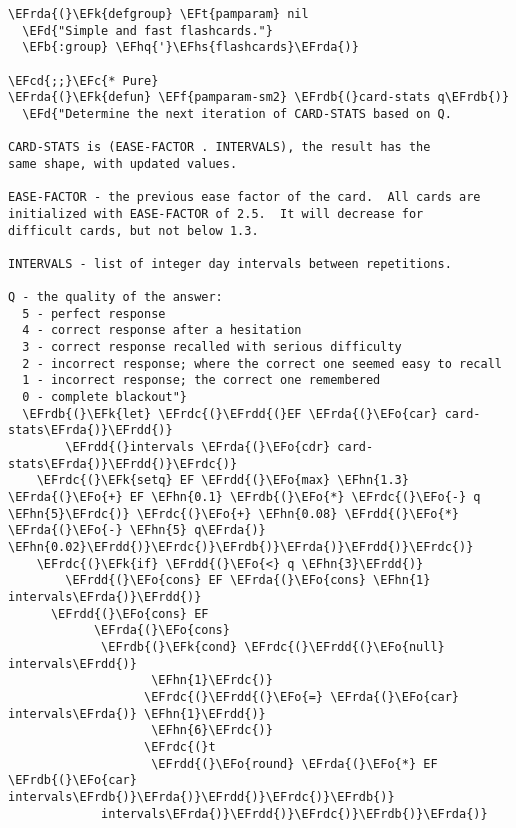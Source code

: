 \documentclass[a4wide,10pt]{article}
\newcommand{\EFc}[1]{\textcolor{EFc}{#1}} %
\newcommand{\EFcd}[1]{\textcolor{EFcd}{#1}} %
\newcommand{\EFd}[1]{\textcolor{EFd}{#1}} %
\newcommand{\EFk}[1]{\textcolor{EFk}{#1}} %
\newcommand{\EFb}[1]{\textcolor{EFb}{#1}} %
\newcommand{\EFf}[1]{\textcolor{EFf}{#1}} %
\newcommand{\EFt}[1]{\textcolor{EFt}{#1}} %
\newcommand{\EFo}[1]{\textcolor{EFo}{#1}} %
\newcommand{\EFhn}[1]{\textcolor{EFhn}{\textbf{#1}}} %
\newcommand{\EFhq}[1]{\textcolor{EFhq}{#1}} %
\newcommand{\EFhs}[1]{\textcolor{EFhs}{#1}} %
\newcommand{\EFrda}[1]{\textcolor{EFrda}{#1}} %
\newcommand{\EFrdb}[1]{\textcolor{EFrdb}{#1}} %
\newcommand{\EFrdc}[1]{\textcolor{EFrdc}{#1}} %
\newcommand{\EFrdd}[1]{\textcolor{EFrdd}{#1}} %
\begin{document}
\begin{Code}
\begin{Verbatim}
\EFrda{(}\EFk{defgroup} \EFt{pamparam} nil
  \EFd{"Simple and fast flashcards."}
  \EFb{:group} \EFhq{'}\EFhs{flashcards}\EFrda{)}

\EFcd{;;}\EFc{* Pure}
\EFrda{(}\EFk{defun} \EFf{pamparam-sm2} \EFrdb{(}card-stats q\EFrdb{)}
  \EFd{"Determine the next iteration of CARD-STATS based on Q.

CARD-STATS is (EASE-FACTOR . INTERVALS), the result has the
same shape, with updated values.

EASE-FACTOR - the previous ease factor of the card.  All cards are
initialized with EASE-FACTOR of 2.5.  It will decrease for
difficult cards, but not below 1.3.

INTERVALS - list of integer day intervals between repetitions.

Q - the quality of the answer:
  5 - perfect response
  4 - correct response after a hesitation
  3 - correct response recalled with serious difficulty
  2 - incorrect response; where the correct one seemed easy to recall
  1 - incorrect response; the correct one remembered
  0 - complete blackout"}
  \EFrdb{(}\EFk{let} \EFrdc{(}\EFrdd{(}EF \EFrda{(}\EFo{car} card-stats\EFrda{)}\EFrdd{)}
        \EFrdd{(}intervals \EFrda{(}\EFo{cdr} card-stats\EFrda{)}\EFrdd{)}\EFrdc{)}
    \EFrdc{(}\EFk{setq} EF \EFrdd{(}\EFo{max} \EFhn{1.3} \EFrda{(}\EFo{+} EF \EFhn{0.1} \EFrdb{(}\EFo{*} \EFrdc{(}\EFo{-} q \EFhn{5}\EFrdc{)} \EFrdc{(}\EFo{+} \EFhn{0.08} \EFrdd{(}\EFo{*} \EFrda{(}\EFo{-} \EFhn{5} q\EFrda{)} \EFhn{0.02}\EFrdd{)}\EFrdc{)}\EFrdb{)}\EFrda{)}\EFrdd{)}\EFrdc{)}
    \EFrdc{(}\EFk{if} \EFrdd{(}\EFo{<} q \EFhn{3}\EFrdd{)}
        \EFrdd{(}\EFo{cons} EF \EFrda{(}\EFo{cons} \EFhn{1} intervals\EFrda{)}\EFrdd{)}
      \EFrdd{(}\EFo{cons} EF
            \EFrda{(}\EFo{cons}
             \EFrdb{(}\EFk{cond} \EFrdc{(}\EFrdd{(}\EFo{null} intervals\EFrdd{)}
                    \EFhn{1}\EFrdc{)}
                   \EFrdc{(}\EFrdd{(}\EFo{=} \EFrda{(}\EFo{car} intervals\EFrda{)} \EFhn{1}\EFrdd{)}
                    \EFhn{6}\EFrdc{)}
                   \EFrdc{(}t
                    \EFrdd{(}\EFo{round} \EFrda{(}\EFo{*} EF \EFrdb{(}\EFo{car} intervals\EFrdb{)}\EFrda{)}\EFrdd{)}\EFrdc{)}\EFrdb{)}
             intervals\EFrda{)}\EFrdd{)}\EFrdc{)}\EFrdb{)}\EFrda{)}


\end{Verbatim}
\end{Code}
\end{document}
